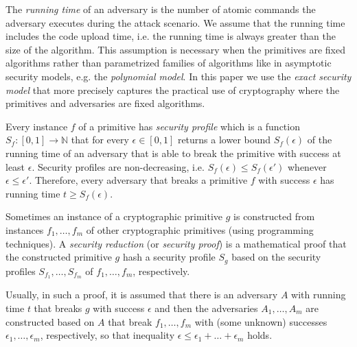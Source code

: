 \documentclass{article}
\begin{document}
The \emph{running time} of an adversary is the number of atomic commands the adversary executes during the attack scenario. We assume that the running time includes the code upload time, i.e. the running time is always greater than the size of the algorithm. This assumption is necessary when the primitives are fixed algorithms rather than parametrized families of algorithms like in asymptotic security models, e.g. the \emph{polynomial model}. In this paper we use the \emph{exact security model} that more precisely captures the practical use of cryptography where the primitives and adversaries are fixed algorithms.

Every instance $f$ of a primitive has \emph{security profile}
which is a function $S_f\colon [0,1]\rightarrow \mathbb{N}$ that for every $\epsilon\in [0,1]$ returns a lower bound $S_f(\epsilon)$ of the running time of an adversary that is able to break the primitive with success at least $\epsilon$.
Security profiles are non-decreasing, i.e.
$S_f(\epsilon)\le S_f(\epsilon')$ whenever $\epsilon\le \epsilon'$.
Therefore, every adversary that breaks a primitive $f$ with success $\epsilon$ has running time $t\ge S_f(\epsilon)$.

Sometimes an instance of a cryptographic primitive $g$ is constructed from instances $f_1, \ldots, f_m$ of other cryptographic primitives (using programming techniques).
A \emph{security reduction} (or \emph{security proof}) is a mathematical proof that the constructed primitive $g$ hash a security profile $S_g$
based on the security profiles $S_{f_1}, \ldots, S_{f_m}$ of $f_1, \ldots, f_m$, respectively.

Usually, in such a proof, it is assumed that there is an adversary $A$ with running time $t$ that breaks $g$ with success $\epsilon$ and then the adversaries $A_1,\ldots, A_m$ are constructed based on $A$ that break $f_1,\ldots,f_m$ with (some unknown) successes $\epsilon_1,\ldots,\epsilon_m$, respectively, so that inequality $\epsilon\le \epsilon_1 + \ldots + \epsilon_m$ holds.
\end{document}
